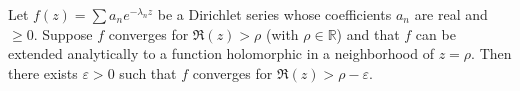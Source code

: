 Let $f(z) = \sum a_n e^{-\lambda_n z}$ be a Dirichlet series whose coefficients $a_n$ are real and $\geq 0$. Suppose $f$ converges for $\Re(z) > \rho$ (with $\rho \in \mathbb{R}$) and that $f$ can be extended analytically to a function holomorphic in a neighborhood of $z = \rho$. Then there exists $\varepsilon > 0$ such that $f$ converges for $\Re(z) > \rho - \varepsilon$.
